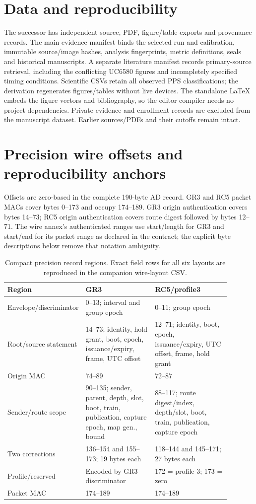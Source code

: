 \documentclass[11pt,letterpaper]{article}
\begin{document}
\section*{Data and reproducibility}
The successor has independent source, PDF, figure/table exports and provenance records. The main evidence manifest binds the selected run and calibration, immutable source/image hashes, analysis fingerprints, metric definitions, seals and historical manuscripts. A separate literature manifest records primary-source retrieval, including the conflicting UC6580 figures and incompletely specified timing conditions. Scientific CSVs retain all observed PPS classifications; the derivation regenerates figures/tables without live devices. The standalone LaTeX embeds the figure vectors and bibliography, so the editor compiler needs no project dependencies. Private evidence and enrollment records are excluded from the manuscript dataset. Earlier sources/PDFs and their cutoffs remain intact.

\appendix
\section{Precision wire offsets and reproducibility anchors}\label{sec:annex}
Offsets are zero-based in the complete 190-byte AD record. GR3 and RC5 packet MACs cover bytes 0--173 and occupy 174--189. GR3 origin authentication covers bytes 14--73; RC5 origin authentication covers route digest followed by bytes 12--71. The wire annex's authenticated ranges use start/length for GR3 and start/end for its packet range as declared in the contract; the explicit byte descriptions below remove that notation ambiguity.

\begin{table}[htbp]\centering\small
\caption{Compact precision record regions. Exact field rows for all six layouts are reproduced in the companion wire-layout CSV.}
\begin{tabular}{@{}L{0.22\linewidth}L{0.32\linewidth}L{0.35\linewidth}@{}}\toprule
Region & GR3 & RC5/profile3\\\midrule
Envelope/discriminator &0--13; interval and group epoch&0--11; group epoch\\
Root/source statement &14--73; identity, hold grant, boot, epoch, issuance/expiry, frame, UTC offset&12--71; identity, boot, epoch, issuance/expiry, UTC offset, frame, hold grant\\
Origin MAC &74--89&72--87\\
Sender/route scope &90--135; sender, parent, depth, slot, boot, train, publication, capture epoch, map gen., bound&88--117; route digest/index, depth/slot, boot, train, publication, capture epoch\\
Two corrections &136--154 and 155--173; 19 bytes each&118--144 and 145--171; 27 bytes each\\
Profile/reserved &Encoded by GR3 discriminator&172 = profile 3; 173 = zero\\
Packet MAC &174--189&174--189\\\bottomrule
\end{tabular}
\end{table}
\end{document}
